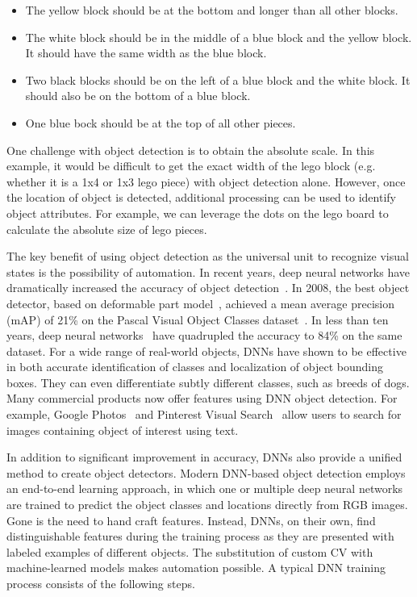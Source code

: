 \begin{itemize}
  \item The yellow block should be at the bottom and longer than all other blocks.
  \item The white block should be in the middle of a blue block and the yellow
  block. It should have the same width as the blue block.
  \item Two black blocks should be on the left of a blue block and the white
  block. It should also be on the bottom of a blue block.
  \item One blue bock should be at the top of all other pieces.
\end{itemize}

One challenge with object detection is to obtain the absolute scale. In this
example, it would be difficult to get the exact width of the lego block (e.g.
whether it is a 1x4 or 1x3 lego piece) with object detection alone. However,
once the location of object is detected, additional processing can be used to
identify object attributes. For example, we can leverage the dots
on the lego board to calculate the absolute size of lego pieces.

The key benefit of using object detection as the universal unit to recognize
visual states is the possibility of automation. In recent years, deep neural
networks have dramatically increased the accuracy of object
detection~\cite{zou2019object}. In 2008, the best object detector, based on
deformable part model~\cite{felzenszwalb2008discriminatively}, achieved a mean
average precision (mAP) of 21\% on the Pascal Visual Object Classes
dataset~\cite{everingham2010pascal}. In less than ten years, deep neural
networks~\cite{he2017mask,Ren2015,He2016,lin2017focal} have quadrupled the
accuracy to 84\% on the same dataset. For a wide range of real-world objects,
DNNs have shown to be effective in both accurate identification of classes and
localization of object bounding boxes.  They can even differentiate subtly
different classes, such as breeds of dogs. Many commercial products now offer
features using DNN object detection. For example, Google
Photos~\cite{googlePhoto} and Pinterest Visual Search~\cite{pinterest} allow
users to search for images containing object of interest using text.

In addition to significant improvement in accuracy, DNNs also provide a unified
method to create object detectors. Modern DNN-based object detection employs an
end-to-end learning approach, in which one or multiple deep neural networks are
trained to predict the object classes and locations directly from RGB images.
Gone is the need to hand craft features. Instead, DNNs, on their
own, find distinguishable features during the training process as they are
presented with labeled examples of different objects. The substitution of custom
CV with machine-learned models makes automation possible. A typical DNN training
process consists of the following steps.

